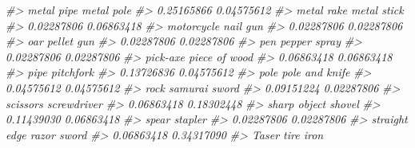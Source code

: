 \documentclass[
]{krantz}
\makeatletter
\newenvironment{Shaded}{\begin{snugshade}}{\end{snugshade}}
\newcommand{\CommentTok}[1]{\textcolor[rgb]{0.37,0.37,0.37}{\textit{#1}}}
\newenvironment{kframe}{%
\medskip{}
\setlength{\fboxsep}{.8em}
 \def\at@end@of@kframe{}%
 \ifinner\ifhmode%
  \def\at@end@of@kframe{\end{minipage}}%
  \begin{minipage}{\columnwidth}%
 \fi\fi%
 \def\FrameCommand##1{\hskip\@totalleftmargin \hskip-\fboxsep
 \colorbox{shadecolor}{##1}\hskip-\fboxsep
     \hskip-\linewidth \hskip-\@totalleftmargin \hskip\columnwidth}%
 \MakeFramed {\advance\hsize-\width
   \@totalleftmargin\z@ \linewidth\hsize
   \@setminipage}}%
 {\par\unskip\endMakeFramed%
 \at@end@of@kframe}
\renewenvironment{Shaded}{\begin{kframe}}{\end{kframe}}
\makeatother
\begin{document}
\begin{Shaded}
\begin{Highlighting}[]
\CommentTok{\#\textgreater{}                       metal pipe                       metal pole }
\CommentTok{\#\textgreater{}                       0.25165866                       0.04575612 }
\CommentTok{\#\textgreater{}                       metal rake                      metal stick }
\CommentTok{\#\textgreater{}                       0.02287806                       0.06863418 }
\CommentTok{\#\textgreater{}                       motorcycle                         nail gun }
\CommentTok{\#\textgreater{}                       0.02287806                       0.02287806 }
\CommentTok{\#\textgreater{}                              oar                       pellet gun }
\CommentTok{\#\textgreater{}                       0.02287806                       0.02287806 }
\CommentTok{\#\textgreater{}                              pen                     pepper spray }
\CommentTok{\#\textgreater{}                       0.02287806                       0.02287806 }
\CommentTok{\#\textgreater{}                         pick{-}axe                    piece of wood }
\CommentTok{\#\textgreater{}                       0.06863418                       0.06863418 }
\CommentTok{\#\textgreater{}                             pipe                        pitchfork }
\CommentTok{\#\textgreater{}                       0.13726836                       0.04575612 }
\CommentTok{\#\textgreater{}                             pole                   pole and knife }
\CommentTok{\#\textgreater{}                       0.04575612                       0.04575612 }
\CommentTok{\#\textgreater{}                             rock                    samurai sword }
\CommentTok{\#\textgreater{}                       0.09151224                       0.02287806 }
\CommentTok{\#\textgreater{}                         scissors                      screwdriver }
\CommentTok{\#\textgreater{}                       0.06863418                       0.18302448 }
\CommentTok{\#\textgreater{}                     sharp object                           shovel }
\CommentTok{\#\textgreater{}                       0.11439030                       0.06863418 }
\CommentTok{\#\textgreater{}                            spear                          stapler }
\CommentTok{\#\textgreater{}                       0.02287806                       0.02287806 }
\CommentTok{\#\textgreater{}              straight edge razor                            sword }
\CommentTok{\#\textgreater{}                       0.06863418                       0.34317090 }
\CommentTok{\#\textgreater{}                            Taser                        tire iron }

\end{Highlighting}
\end{Shaded}
\end{document}

